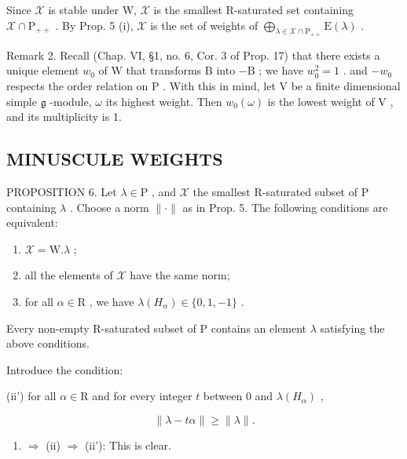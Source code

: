 Since \(\mathcal{X}\) is stable under W, \(\mathcal{X}\) is the smallest R-saturated set containing \(\mathcal{X} \cap \mathrm{P}_{++}\) . By Prop. 5 (i), \(\mathcal{X}\) is the set of weights of \(\bigoplus_{\lambda \in \mathcal{X} \cap \mathrm{P}_{++}} \mathrm{E}(\lambda)\) .

Remark 2. Recall (Chap. VI, §1, no. 6, Cor. 3 of Prop. 17) that there exists a unique element \(w_0\) of \(\mathrm{W}\) that transforms \(\mathrm{B}\) into \(-\mathrm{B}\) ; we have \(w_0^2 = 1\) . and \(-w_0\) respects the order relation on \(\mathrm{P}\) . With this in mind, let \(\mathrm{V}\) be a finite dimensional simple \(\mathfrak{g}\) -module, \(\omega\) its highest weight. Then \(w_0(\omega)\) is the lowest weight of \(\mathrm{V}\) , and its multiplicity is 1.

\subsection{MINUSCULE WEIGHTS}

PROPOSITION 6. Let \(\lambda \in \mathrm{P}\) , and \(\mathcal{X}\) the smallest R-saturated subset of P containing \(\lambda\) . Choose a norm \(\| \cdot \|\) as in Prop. 5. The following conditions are equivalent:

\begin{enumerate}
\def\labelenumi{(\roman{enumi})}
\item
  \(\mathcal{X} = \mathrm{W}.\lambda\) ;
\item
  all the elements of \(\mathcal{X}\) have the same norm;
\item
  for all \(\alpha \in \mathrm{R}\) , we have \(\lambda(H_{\alpha}) \in \{0,1,-1\}\) .
\end{enumerate}

Every non-empty R-saturated subset of P contains an element \(\lambda\) satisfying the above conditions.

Introduce the condition:

(ii') for all \(\alpha \in \mathrm{R}\) and for every integer \(t\) between 0 and \(\lambda(H_{\alpha})\) ,

\[
\| \lambda - t \alpha \| \geq \| \lambda \|.
\]

\begin{enumerate}
\def\labelenumi{(\roman{enumi})}
\tightlist
\item
  \(\Longrightarrow\) (ii) \(\Longrightarrow\) (ii'): This is clear.
\end{enumerate}

